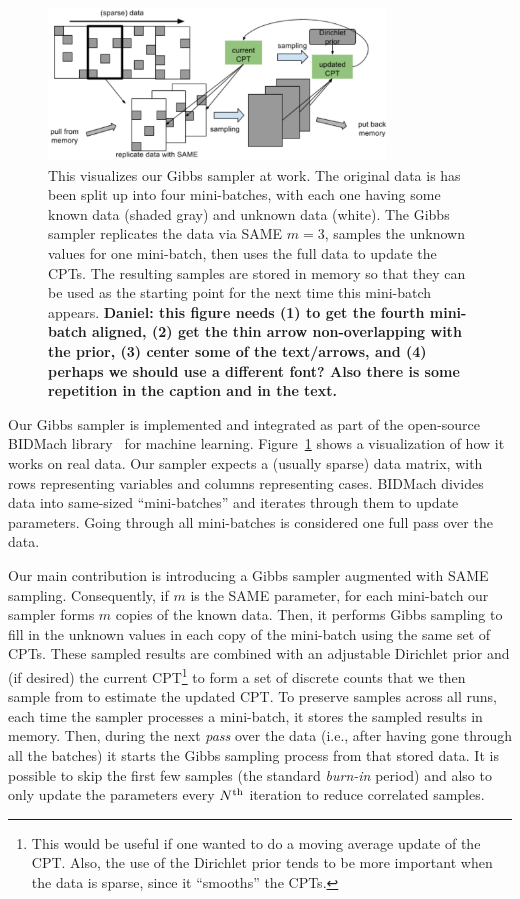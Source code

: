 \documentclass{article} %
\begin{document}
\begin{figure}[t]
\centering
\includegraphics[width=0.8\textwidth]{fig_BIDMach_flow_DRAFT}
\caption{This visualizes our Gibbs sampler at work. The original data is has been split up into four
mini-batches, with each one having some known data (shaded gray) and unknown data (white). The
Gibbs sampler replicates the data via SAME $m=3$, samples the unknown values for one mini-batch,
then uses the full data to update the CPTs. The resulting samples are stored in memory so that they
can be used as the starting point for the next time this mini-batch appears. \textbf{Daniel: this
figure needs (1) to get the fourth mini-batch aligned, (2) get the thin arrow non-overlapping with
the prior, (3) center some of the text/arrows, and (4) perhaps we should use a different font? Also
there is some repetition in the caption and in the text.}}
\label{fig:BIDMach}
\end{figure}

Our Gibbs sampler is implemented and integrated as part of the open-source BIDMach
library~\citep{bidmach} for machine learning.  Figure~\ref{fig:BIDMach} shows a visualization of how
it works on real data. Our sampler expects a (usually sparse) data matrix, with rows representing
variables and columns representing cases. BIDMach divides data into same-sized ``mini-batches'' and
iterates through them to update parameters. Going through all mini-batches is considered one full
pass over the data.

Our main contribution is introducing a Gibbs sampler augmented with SAME sampling.  Consequently,
if $m$ is the SAME parameter, for each mini-batch our sampler forms $m$ copies of the known data.
Then, it performs Gibbs sampling to fill in the unknown values in each copy of the mini-batch using
the same set of CPTs.  These sampled results are combined with an adjustable Dirichlet prior and (if
desired) the current CPT\footnote{This would be useful if one wanted to do a moving average update
of the CPT. Also, the use of the Dirichlet prior tends to be more important when the data is sparse,
since it ``smooths'' the CPTs.} to form a set of discrete counts that we then sample from to
estimate the updated CPT. To preserve samples across all runs, each time the sampler processes a
mini-batch, it stores the sampled results in memory.  Then, during the next \emph{pass} over the
data (i.e., after having gone through all the batches) it starts the Gibbs sampling process from
that stored data. It is possible to skip the first few samples (the standard \emph{burn-in} period)
and also to only update the parameters every $N^{\rm th}$ iteration to reduce correlated samples.
\end{document}
